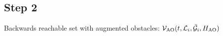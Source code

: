 \subsection{Step 2}
Backwards reachable set with augmented obstacles: $\mathcal{V}_\text{AO}(t, \mathcal{L}_i, \bar{\mathcal{G}}_i, H_\text{AO})$